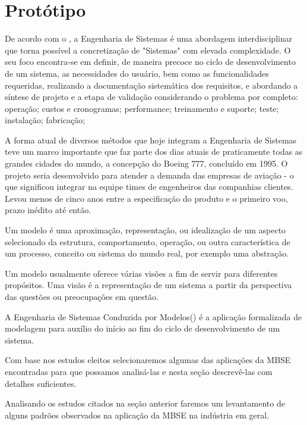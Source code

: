 \section{Protótipo}

De acordo com o \cite{INCOSE200402}, a Engenharia de Sistemas é uma abordagem interdisciplinar que torna possível a concretização de "Sistemas" com elevada complexidade. O seu foco encontra-se em definir, de maneira precoce no ciclo de desenvolvimento de um sistema, as necessidades do usuário, bem como as funcionalidades requeridas, realizando a documentação sistemática dos requisitos, e abordando a síntese de projeto e a etapa de validação considerando o problema por completo: operação; custos e cronogramas; performance; treinamento e suporte; teste; instalação; fabricação;

A forma atual de diversos métodos que hoje integram a Engenharia de Sistemas teve um marco importante que faz parte dos dias atuais de praticamente todas as grandes cidades do mundo, a concepção do Boeing 777, concluído em 1995. O projeto seria desenvolvido para atender a demanda das empresas de aviação - o que significou integrar na equipe times de engenheiros das companhias clientes. Levou menos de cinco anos entre a especificação do produto e o primeiro voo, prazo inédito até então. \cite{EngSisUFMG}


Um modelo é uma aproximação, representação, ou idealização de um aspecto selecionado da estrutura, comportamento, operação, ou outra característica de um processo, conceito ou sistema do mundo real, por exemplo uma abstração.\cite{IEEE61012}

Um modelo usualmente oferece várias visões a fim de servir para diferentes propósitos. Uma visão é a representação de um sistema a partir da perspectiva das questões ou preocupações em questão. \cite{IEEE1471}

A Engenharia de Sistemas Conduzida por Modelos() é a aplicação formalizada de modelagem para auxílio do início ao fim do ciclo de desenvolvimento de um sistema.\cite{INCOSE200402}


Com base nos estudos eleitos selecionaremos algumas das aplicações da MBSE encontradas para que possamos analisá-las e nesta seção descrevê-las com detalhes suficientes.


Analisando os estudos citados na seção anterior faremos um levantamento de alguns padrões observados na aplicação da MBSE na indústria em geral.